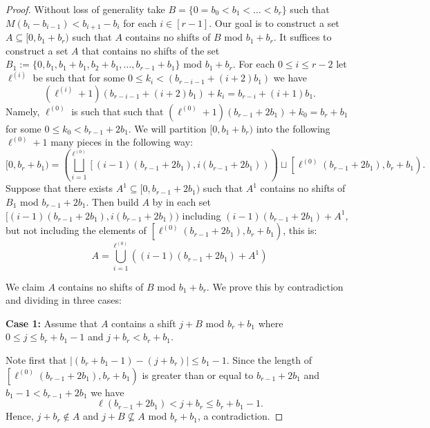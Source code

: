 \documentclass[letter, 11pt]{article}
\theoremstyle{plain} %
\theoremstyle{definition} %
\theoremstyle{plain}
\theoremstyle{plain}
\newcommand{\1}{\mathbbm{1}}
\begin{document}
\begin{proof}
    Without loss of generality take $B=\{0 = b_0 < b_1< \ldots < b_r\} $ such that $M(b_{i}- b_{i-1}) < b_{i+1} - b_i$ for each $i\in [r-1]$. Our goal is to construct a set $A \subseteq [0,b_1 + b_r)$ such that $A$ contains no shifts of $B $ mod $b_1 + b_r$. It suffices to construct a set $A$ that contains no shifts of the set $B_1:=\{0, b_1, b_1+b_1, b_2 + b_1, \ldots ,b_{r-1} + b_1\}$ mod $b_1 + b_r$. For each $0 \leq i \leq r-2$ let $\ell^{(i)}$ be such that for some $0 \leq k_i < (b_{r-i-1} + (i+2)b_1)$ we have
        \[
        (\ell^{(i)} +1)(b_{r-i-1} + (i+2)b_1) + k_i = b_{r-i} + (i + 1)b_1.
        \]
    Namely, $\ell^{(0)}$ is such that such that $(\ell^{(0)} + 1)(b_{r-1} + 2 b_1) + k_0 = b_r + b_1$ for some $0 \leq k_0 < b_{r-1} + 2b_1$. We will partition $[0, b_1 + b_r )$ into the following $\ell^{(0)} + 1$ many pieces in the following way:
    \[ [0, b_r + b_1 )=  \left(\bigsqcup_{i=1}^{\ell^{(0)}} \left[(i - 1) (b_{r-1} + 2 b_1) , i (b_{r-1} + 2 b_1)\right) \right) \sqcup  \left[\ell^{(0)}(b_{r-1} + 2 b_1), b_r + b_1 \right).\]
    Suppose that there exists $A^1 \subseteq [0,b_{r-1} + 2 b_1)$ such that $A^1$ contains no shifts of $B_1$ mod $b_{r-1} + 2b_1$. Then build $A$ by in each set $[(i-1)(b_{r-1} + 2 b_1) , i(b_{r-1} + 2 b_1))$ including $(i-1)(b_{r-1} + 2 b_1) + A^1$, but not including the elements of $\left[\ell^{(0)}(b_{r-1} + 2 b_1), b_r + b_1 \right)$, this is:
    \[ A=\bigcup_{i=1}^{\ell^{(0)}} \left( (i-1)(b_{r-1} + 2 b_1) + A^1  \right)\]
    
    We claim $A$ contains no shifts of $B$ mod $b_1 + b_r$. We prove this by contradiction and dividing in three cases:

    \textbf{Case 1:} Assume that $A$ contains a shift $j + B $ mod $b_r + b_1$ where $0\leq j \leq b_r+b_1 -1$ and $j + b_r < b_r + b_1$.

    Note first that $|(b_r + b_1 -1) - (j + b_r)|\leq b_1 -1$. Since the length of $\left[\ell^{(0)}(b_{r-1} + 2 b_1), b_r + b_1 \right)$ is greater than or equal to $b_{r-1} + 2b_1$ and $b_1 -1< b_{r-1} + 2b_1$ we have $$\ell(b_{r-1} + 2 b_1) < j +b_r \leq b_r + b_1 -1.$$ Hence, $j + b_r \notin A$ and $j + B \not\subseteq A $ mod $b_r + b_1$, a contradiction.


\end{proof}
\end{document}
